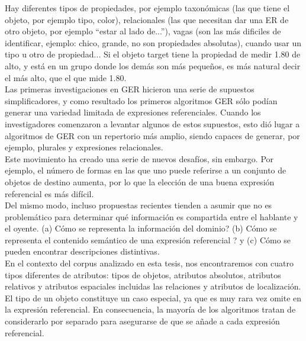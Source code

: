 Hay diferentes tipos de propiedades, por ejemplo taxon\'omicas (las que tiene el objeto, por ejemplo tipo, color), relacionales (las que necesitan dar una ER de otro objeto, por ejemplo ``estar al lado de...''), vagas (son las m\'as dificiles de identificar, ejemplo: chico, grande, no son propiedades absolutas), cuando usar un tipo u otro de propiedad... 
Si el objeto target tiene la propiedad de medir 1.80 de alto, y est\'a en un grupo donde los dem\'as son m\'as peque\~nos, es m\'as natural decir el m\'as alto, que el que mide 1.80.\\



Las primeras investigaciones en GER hicieron una serie de supuestos simplificadores, y como resultado los primeros
algoritmos GER s\'olo pod\'ian generar una variedad limitada de expresiones referenciales. Cuando
los investigadores comenzaron a levantar algunos de estos supuestos, esto di\'o lugar a algoritmos de GER
con un repertorio m\'as amplio, siendo capaces de generar, por ejemplo, plurales y expresiones relacionales. \\

Este movimiento ha creado una serie de nuevos desaf\'ios, sin embargo. Por ejemplo, el
n\'umero de formas en las que uno puede referirse a un conjunto de objetos de destino aumenta, por lo que la elecci\'on de una
buena expresi\'on referencial es m\'as dif\'icil.\\

Del mismo modo, incluso propuestas recientes tienden a asumir que no es problem\'atico para determinar qu\'e informaci\'on
es compartida entre el hablante y el oyente.
 (a) C\'omo se representa la informaci\'on del dominio?
(b) C\'omo se representa el contenido sem\'antico de una expresi\'on referencial ? y (c) C\'omo se pueden encontrar descripciones distintivas.\\

 En el contexto del corpus analizado en esta tesis, nos encontraremos con cuatro tipos diferentes de atributos:
tipos de objetos, atributos absolutos, atributos relativos y atributos espaciales incluidas las relaciones y atributos de localizaci\'on.\\

El tipo de un objeto constituye un caso especial, ya que es muy rara vez omite
en la expresi\'on referencial. En consecuencia, la mayor\'ia de los algoritmos tratan de
considerarlo por separado para asegurarse de que se a\~nade a cada expresi\'on referencial. \\

